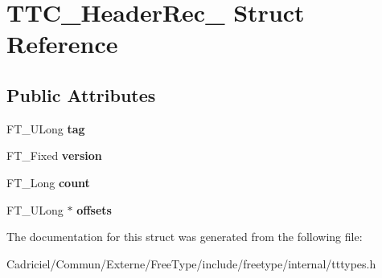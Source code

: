 \hypertarget{struct_t_t_c___header_rec__}{\section{T\-T\-C\-\_\-\-Header\-Rec\-\_\- Struct Reference}
\label{struct_t_t_c___header_rec__}
}
\subsection*{Public Attributes}
\begin{DoxyCompactItemize}
\item 
\hypertarget{struct_t_t_c___header_rec___a7fc09906e402f8937b6ca207c84453b4}{F\-T\-\_\-\-U\-Long {\bfseries tag}}\label{struct_t_t_c___header_rec___a7fc09906e402f8937b6ca207c84453b4}

\item 
\hypertarget{struct_t_t_c___header_rec___aa9ecb33279c68c3c00c1232441da5801}{F\-T\-\_\-\-Fixed {\bfseries version}}\label{struct_t_t_c___header_rec___aa9ecb33279c68c3c00c1232441da5801}

\item 
\hypertarget{struct_t_t_c___header_rec___a0bf5898e9d8c55bc74f51712a5ad1b58}{F\-T\-\_\-\-Long {\bfseries count}}\label{struct_t_t_c___header_rec___a0bf5898e9d8c55bc74f51712a5ad1b58}

\item 
\hypertarget{struct_t_t_c___header_rec___a2ab33f787e8085d7086968fb931060b5}{F\-T\-\_\-\-U\-Long $\ast$ {\bfseries offsets}}\label{struct_t_t_c___header_rec___a2ab33f787e8085d7086968fb931060b5}

\end{DoxyCompactItemize}


The documentation for this struct was generated from the following file\-:\begin{DoxyCompactItemize}
\item 
Cadriciel/\-Commun/\-Externe/\-Free\-Type/include/freetype/internal/tttypes.\-h\end{DoxyCompactItemize}
